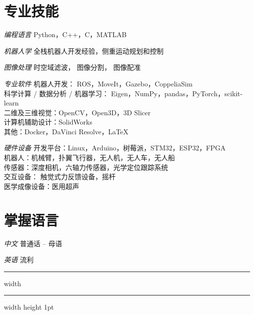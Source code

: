 \documentclass[utf8, 11pt,letterpaper]{report}
\begin{document}
\section*{专业技能}
\begin{tablist}
	\item[\textit{编程语言}] \tab Python，C++，C，MATLAB
	\item[\textit{机器人学}] \tab 全栈机器人开发经验，侧重运动规划和控制
	\item [\textit{图像处理}] \tab 时空域滤波， 图像分割， 图像配准
	\item[\textit{专业软件}] \tab 机器人开发： ROS，MoveIt，Gazebo，CoppeliaSim\\
	科学计算 / 数据分析 / 机器学习： Eigen，NumPy，pandas，PyTorch，scikit-learn\\
	二维及三维视觉：OpenCV，Open3D，3D Slicer\\
	计算机辅助设计：SolidWorks\\
	其他：Docker，DaVinci Resolve，\LaTeX
	\item[\textit{硬件设备}] \tab 开发平台：Linux，Arduino，树莓派，STM32，ESP32，FPGA\\
	机器人：机械臂，扑翼飞行器，无人机，无人车，无人船\\ 
	传感器：深度相机，六轴力传感器，光学定位跟踪系统\\
	交互设备： 触觉式力反馈设备，摇杆\\
	医学成像设备：医用超声
\end{tablist}


\section*{掌握语言}
\begin{tablist}
	\item[\textit{中文}] \tab 普通话 -- 母语
	\item[\textit{英语}] \tab 流利
\end{tablist}
\vfill
\hrule width \hsize \kern 1mm \hrule width \hsize height 1pt 
\end{document}

